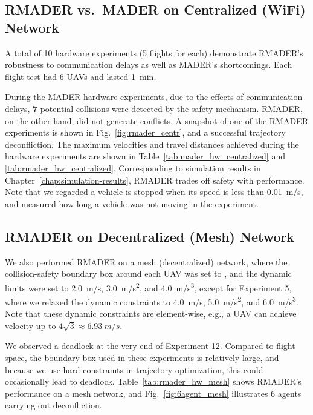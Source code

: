 \subsection{RMADER vs.\ MADER on Centralized (WiFi) Network}
 A total of 10 hardware experiments (5 flights for each) demonstrate RMADER's robustness to communication delays as well as MADER's shortcomings. Each flight test had 6 UAVs and lasted \SI{1}{\minute}. 

During the MADER hardware experiments, due to the effects of communication delays, \textbf{7} potential collisions were detected by the safety mechanism. RMADER, on the other hand, did not generate conflicts. 
A snapshot of one of the RMADER experiments is shown in Fig.~\ref{fig:rmader_centr}, and a successful trajectory deconfliction.
The maximum velocities and travel distances achieved during the hardware experiments are shown in Table~\ref{tab:mader_hw_centralized} and \ref{tab:rmader_hw_centralized}. Corresponding to simulation results in Chapter~\ref{chap:simulation-results}, RMADER trades off safety with performance.
Note that we regarded a vehicle is stopped when its speed is less than \SI{0.01}{\m/\s}, and measured how long a vehicle was not moving in the experiment.

\subsection{RMADER on Decentralized (Mesh) Network}
We also performed RMADER on a mesh (decentralized) network, where the collision-safety boundary box around each UAV was set to , and the dynamic limits were set to \SI{2.0}{\m/\s}, \SI{3.0}{\m/\s^2}, and \SI{4.0}{\m/\s^3}, except for Experiment 5, where we relaxed the dynamic constraints to \SI{4.0}{\m/\s}, \SI{5.0}{\m/\s^2}, and \SI{6.0}{\m/\s^3}.
Note that these dynamic constraints are element-wise, e.g., a UAV can achieve velocity up to $4\sqrt{3} \approx \SI{6.93}{m/s}$.

We observed a deadlock at the very end of Experiment 12.
Compared to flight space, the boundary box used in these experiments is relatively large, and because we use hard constraints in trajectory optimization, this could occasionally lead to deadlock.
Table~\ref{tab:rmader_hw_mesh} shows RMADER's performance on a mesh network, and Fig.~\ref{fig:6agent_mesh} illustrates 6 agents carrying out deconfliction.

